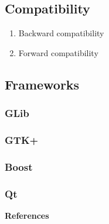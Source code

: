 \documentclass[12pt,a4paper]{article}
\begin{document}
\subsection{Compatibility}

\begin{enumerate}
\item Backward compatibility
\item Forward compatibility
\end{enumerate}

\subsection{Frameworks}

\subsubsection{GLib}

\subsubsection{GTK+}

\subsubsection{Boost}

\subsubsection{Qt}

\textbf{References}
\end{document}
